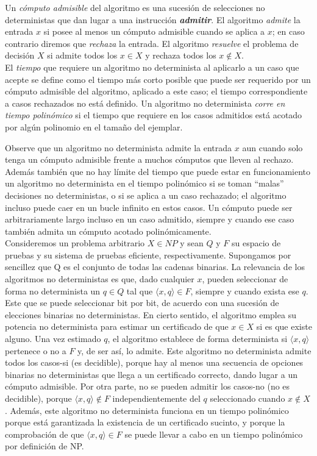 \begin{fondo}
Un \emph{cómputo admisible} del algoritmo es una sucesión de selecciones no deterministas que dan lugar a  una instrucción \emph{\textbf{admitir}}. El algoritmo \emph{admite} la entrada $x$ si posee al menos un cómputo admisible cuando se aplica a $x$; en caso contrario diremos que \emph{rechaza} la entrada. El algoritmo \emph{resuelve} el problema de decisión $X$ si admite todos los $x \in X$ y rechaza todos los $x \notin X$.\\
El \emph{tiempo} que requiere un algoritmo no determinista al aplicarlo a un caso que acepte se define como el tiempo más corto posible que puede ser requerido por un cómputo admisible del algoritmo, aplicado a este caso; el tiempo correspondiente a casos rechazados no está definido. Un algoritmo no determinista \emph{corre en tiempo polinómico} si el tiempo que requiere en los casos admitidos está acotado por algún polinomio en el tamaño del ejemplar.\\
\end{fondo}

Observe que un algoritmo no determinista admite la entrada $x$ aun cuando solo tenga un cómputo admisible frente a muchos cómputos que lleven al rechazo. Además también que no hay límite del tiempo que puede estar en funcionamiento un algoritmo no determinista en el tiempo polinómico si se toman ``malas'' decisiones no deterministas, o si se aplica a un caso rechazado; el algoritmo incluso puede caer en un bucle infinito en estos casos. Un cómputo puede ser arbitrariamente largo incluso en un caso admitido, siempre y cuando ese caso también admita un cómputo acotado polinómicamente.\\

Consideremos un problema arbitrario $X \in NP$ y sean $Q$ y $F$ su espacio de pruebas y su sistema de pruebas eficiente, respectivamente. Supongamos por sencillez que Q es el conjunto de todas las cadenas binarias. La relevancia de los algoritmos no deterministas es que, dado cualquier $x$, pueden seleccionar de forma no determinista un $q \in Q$ tal que $\langle x, q \rangle \in F$, siempre y cuando exista ese $q$. Este que se puede seleccionar bit por bit, de acuerdo con una sucesión de elecciones binarias no deterministas. En cierto sentido, el algoritmo emplea su potencia no determinista para estimar un certificado de que $x \in X$ si es que existe alguno. Una vez estimado $q$, el algoritmo establece de forma determinista si $\langle x, q \rangle$ pertenece o no a $F$ y, de ser así, lo admite. Este algoritmo no determinista admite todos los casos-si (es decidible), porque hay al menos una secuencia de opciones binarias no deterministas que llega a un certificado correcto, dando lugar a un cómputo admisible. Por otra parte, no se pueden admitir los casos-no (no es decidible), porque $\langle x , q \rangle \notin F$ independientemente del $q$ seleccionado cuando $x \notin X$. Además, este algoritmo no determinista funciona en un tiempo polinómico porque está garantizada la existencia de un certificado sucinto, y porque la comprobación de que $\langle x, q \rangle \in F$ se puede llevar a cabo en un tiempo polinómico por definición de NP.\\

